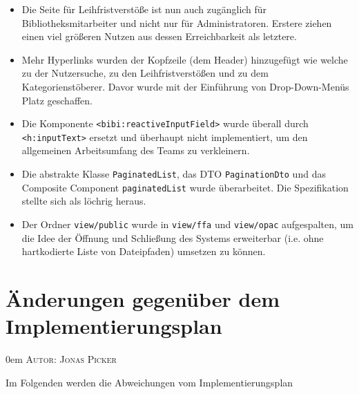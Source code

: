 \documentclass{article}
\makeatletter
\newcommand{\sectionauthor}[1]{
	{\parindent 0em \large \scshape Autor: #1 \par \nobreak \vspace*{1em}}
	\@afterheading
}
\makeatother
\begin{document}
\begin{itemize}
    \item Die Seite für Leihfristverstöße ist nun auch zugänglich für Bibliotheksmitarbeiter und nicht nur für Administratoren. Erstere ziehen einen viel größeren Nutzen aus dessen Erreichbarkeit als letztere.
    \item Mehr Hyperlinks wurden der Kopfzeile (dem Header) hinzugefügt wie welche zu der Nutzersuche, zu den Leihfristverstößen und zu dem Kategorienstöberer. Davor wurde mit der Einführung von Drop-Down-Menüs Platz geschaffen.
    \item Die Komponente \texttt{<bibi:reactiveInputField>} wurde überall durch \texttt{<h:inputText>} ersetzt und überhaupt nicht implementiert, um den allgemeinen Arbeitsumfang des Teams zu verkleinern.
    \item Die abstrakte Klasse \texttt{PaginatedList}, das DTO \texttt{PaginationDto} und das Composite Component \texttt{paginatedList} wurde überarbeitet. Die Spezifikation stellte sich als löchrig heraus.
    \item Der Ordner \texttt{view/public} wurde in \texttt{view/ffa} und \texttt{view/opac} aufgespalten, um die Idee der Öffnung und Schließung des Systems erweiterbar (i.e. ohne hartkodierte Liste von Dateipfaden) umsetzen zu können.
\end{itemize}

\section{Änderungen gegenüber dem Implementierungsplan}
\sectionauthor{Jonas Picker}
Im Folgenden werden die Abweichungen vom Implementierungsplan
\end{document}
